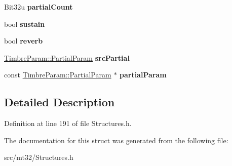 \begin{DoxyCompactItemize}
\item 
\hypertarget{structMT32Emu_1_1PatchCache_aa83cf8ca1028028f494ca24dc445e293}{Bit32u {\bfseries partial\-Count}}\label{structMT32Emu_1_1PatchCache_aa83cf8ca1028028f494ca24dc445e293}

\item 
\hypertarget{structMT32Emu_1_1PatchCache_a30bd40a180bb0ac2b89d4c1c9e12c69e}{bool {\bfseries sustain}}\label{structMT32Emu_1_1PatchCache_a30bd40a180bb0ac2b89d4c1c9e12c69e}

\item 
\hypertarget{structMT32Emu_1_1PatchCache_ad45b5fe3d3559f75c72ab43895f95fdb}{bool {\bfseries reverb}}\label{structMT32Emu_1_1PatchCache_ad45b5fe3d3559f75c72ab43895f95fdb}

\item 
\hypertarget{structMT32Emu_1_1PatchCache_a89fe48c4fec7f5f369853a8463c7bed8}{\hyperlink{structMT32Emu_1_1TimbreParam_1_1PartialParam}{Timbre\-Param\-::\-Partial\-Param} {\bfseries src\-Partial}}\label{structMT32Emu_1_1PatchCache_a89fe48c4fec7f5f369853a8463c7bed8}

\item 
\hypertarget{structMT32Emu_1_1PatchCache_a5652e36cb5d4a39d619b38e8624f7989}{const \hyperlink{structMT32Emu_1_1TimbreParam_1_1PartialParam}{Timbre\-Param\-::\-Partial\-Param} $\ast$ {\bfseries partial\-Param}}\label{structMT32Emu_1_1PatchCache_a5652e36cb5d4a39d619b38e8624f7989}

\end{DoxyCompactItemize}


\subsection{Detailed Description}


Definition at line 191 of file Structures.\-h.



The documentation for this struct was generated from the following file\-:\begin{DoxyCompactItemize}
\item 
src/mt32/Structures.\-h\end{DoxyCompactItemize}

